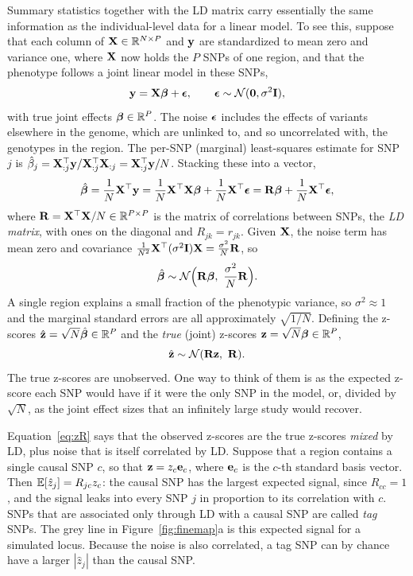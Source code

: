 Summary statistics together with the LD matrix carry essentially the same information as the individual-level data for a linear model. To see this, suppose that each column of $\mathbf{X}\in\mathbb{R}^{N\times P}$ and $\mathbf{y}$ are standardized to mean zero and variance one, where $\mathbf{X}$ now holds the $P$ SNPs of one region, and that the phenotype follows a joint linear model in these SNPs,
\begin{equation}
  \mathbf{y}=\mathbf{X}\boldsymbol{\beta}+\boldsymbol{\epsilon},\qquad\boldsymbol{\epsilon}\sim\mathcal{N}(\mathbf{0},\sigma^2\mathbf{I}),
\end{equation}
with true joint effects $\boldsymbol{\beta}\in\mathbb{R}^P$. The noise $\boldsymbol{\epsilon}$ includes the effects of variants elsewhere in the genome, which are unlinked to, and so uncorrelated with, the genotypes in the region. The per-SNP (marginal) least-squares estimate for SNP $j$ is $\hat\beta_j=\mathbf{X}_{:j}^\top\mathbf{y}/\mathbf{X}_{:j}^\top\mathbf{X}_{:j}=\mathbf{X}_{:j}^\top\mathbf{y}/N$. Stacking these into a vector,
\begin{equation}
  \hat{\boldsymbol{\beta}} = \frac1N\mathbf{X}^\top\mathbf{y} = \frac1N\mathbf{X}^\top\mathbf{X}\boldsymbol{\beta} + \frac1N\mathbf{X}^\top\boldsymbol{\epsilon} = \mathbf{R}\boldsymbol{\beta} + \frac1N\mathbf{X}^\top\boldsymbol{\epsilon},
\end{equation}
where $\mathbf{R}=\mathbf{X}^\top\mathbf{X}/N\in\mathbb{R}^{P\times P}$ is the matrix of correlations between SNPs, the \emph{LD matrix}, with ones on the diagonal and $R_{jk}=r_{jk}$. Given $\mathbf{X}$, the noise term has mean zero and covariance $\frac1{N^2}\mathbf{X}^\top(\sigma^2\mathbf{I})\mathbf{X}=\frac{\sigma^2}N\mathbf{R}$, so
\begin{equation}
  \hat\vb\sim\Normal\Bigl(\mR\vb,\ \frac{\sigma^2}N\mR\Bigr).
\end{equation}
A single region explains a small fraction of the phenotypic variance, so $\sigma^2\approx1$ and the marginal standard errors are all approximately $\sqrt{1/N}$. Defining the z-scores $\hat{\mathbf{z}}=\sqrt N\hat{\boldsymbol{\beta}}\in\mathbb{R}^P$ and the \emph{true} (joint) z-scores $\mathbf{z}=\sqrt N\boldsymbol{\beta}\in\mathbb{R}^P$,
\begin{equation}
  \hat{\mathbf{z}}\sim\mathcal{N}(\mathbf{R}\mathbf{z},\ \mathbf{R}).
  \label{eq:zR}
\end{equation}
The true z-scores are unobserved. One way to think of them is as the expected z-score each SNP would have if it were the only SNP in the model, or, divided by $\sqrt N$, as the joint effect sizes that an infinitely large study would recover.

Equation~\eqref{eq:zR} says that the observed z-scores are the true z-scores \emph{mixed} by LD, plus noise that is itself correlated by LD. Suppose that a region contains a single causal SNP $c$, so that $\mathbf{z}=z_c\mathbf{e}_c$, where $\mathbf{e}_c$ is the $c$-th standard basis vector. Then $\mathbb{E}[\hat z_j]=R_{jc}z_c$: the causal SNP has the largest expected signal, since $R_{cc}=1$, and the signal leaks into every SNP $j$ in proportion to its correlation with $c$. SNPs that are associated only through LD with a causal SNP are called \emph{tag} SNPs. The grey line in Figure~\ref{fig:finemap}a is this expected signal for a simulated locus. Because the noise is also correlated, a tag SNP can by chance have a larger $|\hat z_j|$ than the causal SNP.

